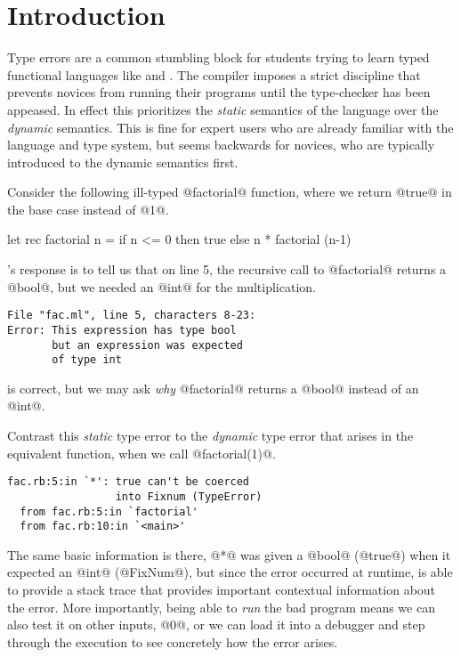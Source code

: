 \section{Introduction}
\label{sec:introduction}

Type errors are a common stumbling block for students trying to learn
typed functional languages like \ocaml and \haskell.
%
The compiler imposes a strict discipline that prevents novices from
running their programs until the type-checker has been appeased.
%
In effect this prioritizes the \emph{static} semantics of the language
over the \emph{dynamic} semantics.
%
This is fine for expert users who are already familiar with the language
and type system, but seems backwards for novices, who are typically
introduced to the dynamic semantics first.

Consider the following ill-typed @factorial@ function, where we return
@true@ in the base case instead of @1@.
%
\begin{code}
  let rec factorial n =
    if n <= 0 then
      true
    else
      n * factorial (n-1)
\end{code}
%
\ocaml's response is to tell us that on line 5, the recursive call to
@factorial@ returns a @bool@, but we needed an @int@ for the
multiplication.
%
\begin{verbatim}
File "fac.ml", line 5, characters 8-23:
Error: This expression has type bool
       but an expression was expected
       of type int
\end{verbatim}
%
\ocaml is correct, but we may ask \emph{why} @factorial@ returns a
@bool@ instead of an @int@.

Contrast this \emph{static} type error to the \emph{dynamic} type error
that arises in the equivalent \ruby function, when we call
@factorial(1)@.
%
\begin{verbatim}
fac.rb:5:in `*': true can't be coerced
                 into Fixnum (TypeError)
  from fac.rb:5:in `factorial'
  from fac.rb:10:in `<main>'
\end{verbatim}
%
The same basic information is there, @*@ was given a @bool@ (@true@)
when it expected an @int@ (@FixNum@), but since the error occurred at
runtime, \ruby is able to provide a stack trace that provides important
contextual information about the error.
%
More importantly, being able to \emph{run} the bad program means we can
also test it on other inputs, \eg @0@, or we can load it into a debugger
and step through the execution to see concretely how the error arises.

